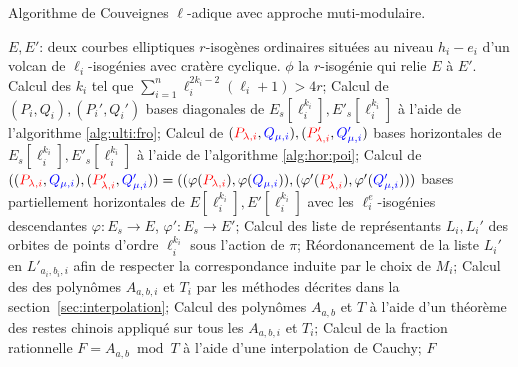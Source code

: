 \documentclass[10pt,a4paper]{book}
\theoremstyle{plain}
\theoremstyle{definition}
\theoremstyle{definition}
\theoremstyle{definition}
\theoremstyle{definition}
\theoremstyle{remark}
\theoremstyle{remark}
\theoremstyle{definition}
\begin{document}
\begin{algorithm}
\caption{\label{alg:cou:mult-adique} Algorithme de Couveignes $\ell$-adique avec approche muti-modulaire.}
\begin{algorithmic}[1]
\REQUIRE $E,E'$: deux courbes elliptiques $r$-isogènes ordinaires situées au niveau $h_i-e_i$ d'un volcan de $\ell_i$-isogénies avec cratère cyclique.
\ENSURE $\phi$ la $r$-isogénie qui relie $E$ à $E'$.
\STATE Calcul des $k_i$ tel que $\sum_{i=1}^n\ell_{i}^{2k_{i}-2}(\ell_{i}+1)>4r$;
\STATE  \label{alg:cou-mult:bdiag:long}
Calcul de $(P_i,Q_i),(P_i',Q_i')$ bases diagonales de $E_s[\ell_i^{k_i}],E'_s[\ell_i^{k_i}]$ à l'aide de l'algorithme \ref{alg:ulti:fro};
\STATE \label{alg:cou-mult:bhor:long}
Calcul de $(\color{red}P_{\lambda,i}\color{black},\color{blue}Q_{\mu,i}\color{black}),(\color{red}P'_{\lambda,i}\color{black},\color{blue}Q'_{\mu,i}\color{black})$ bases horizontales de $E_s[\ell_i^{k_i}],E'_s[\ell_i^{k_i}]$ à l'aide de l'algorithme \ref{alg:hor:poi};
\STATE Calcul de 
~$((\color{red}P_{\lambda,i}\color{black},\color{blue}Q_{\mu,i}\color{black}),(\color{red}P'_{\lambda,i}\color{black},\color{blue}Q_{\mu,i}'\color{black}))=((\varphi(\color{red}P_{\lambda,i}\color{black}),\varphi(\color{blue}Q_{\mu,i}\color{black})),(\varphi'(\color{red}P'_{\lambda,i}\color{black}),\varphi'(\color{blue}Q_{\mu,i}'\color{black})))$ bases partiellement horizontales de $E[\ell_i^{k_i}],E'[\ell_i^{k_i}]$ avec les $\ell_i^e$-isogénies descendantes $\varphi: E_s \rightarrow E$, $\varphi': E_s \rightarrow E'$;
\ENDIF
\STATE \label{alg:mult-ell:rep:long} Calcul des liste de représentants $L_i,L_i'$ des orbites de points d'ordre $\ell_i^{k_i}$ sous l'action de $\pi$;
\ENDFOR
{}
\STATE \label{alg:mult-ell:ord:long} Réordonancement de la liste $L_i'$ en $L'_{a_i,b_i,i}$ afin de respecter la correspondance induite par le choix de $M_i$;
\STATE \label{alg:mult-ell:int:long} Calcul des des polynômes $A_{a,b,i}$ et $T_i$ par les méthodes décrites dans la section~\ref{sec:interpolation};
\ENDFOR
\STATE Calcul des polynômes $A_{a,b}$ et $T$ à l'aide d'un théorème des restes chinois appliqué sur tous les $A_{a,b,i}$ et $T_i$;
\STATE \label{alg:mult-ell:Cauchy:long} Calcul de la fraction rationnelle $F=A_{a,b} \bmod T$ à l'aide d'une interpolation de Cauchy;
\RETURN $F$
\ENDIF
\ENDFOR 
\end{algorithmic}
\end{algorithm}

\printnomenclature


\end{document}

